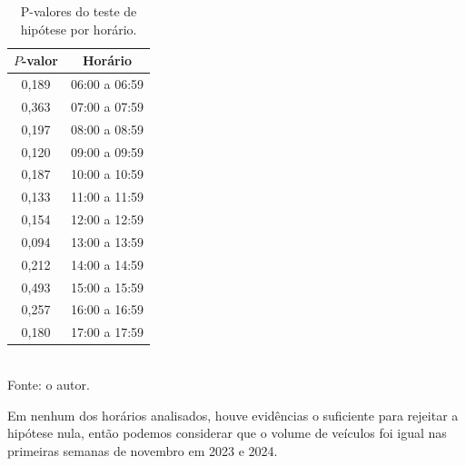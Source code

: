 \begin{table}[H]
\centering
\caption{P-valores do teste de hipótese por horário.}
\begin{tabular}{cc}
\hline
\textbf{\(P\)-valor} & \textbf{Horário} \\ \hline
0,189 & 06:00 a 06:59 \\
0,363 & 07:00 a 07:59 \\
0,197 & 08:00 a 08:59 \\
0,120 & 09:00 a 09:59 \\
0,187 & 10:00 a 10:59 \\
0,133 & 11:00 a 11:59 \\
0,154 & 12:00 a 12:59 \\
0,094 & 13:00 a 13:59 \\
0,212 & 14:00 a 14:59 \\
0,493 & 15:00 a 15:59 \\
0,257 & 16:00 a 16:59 \\
0,180 & 17:00 a 17:59 \\ \hline
\end{tabular}
{\footnotesize\\ Fonte: o autor.}
\label{tab:pvalores}
\end{table}




Em nenhum dos horários analisados, houve evidências o suficiente para rejeitar a hipótese nula, então podemos considerar que o volume de veículos foi igual nas primeiras semanas de novembro em 2023 e 2024.
